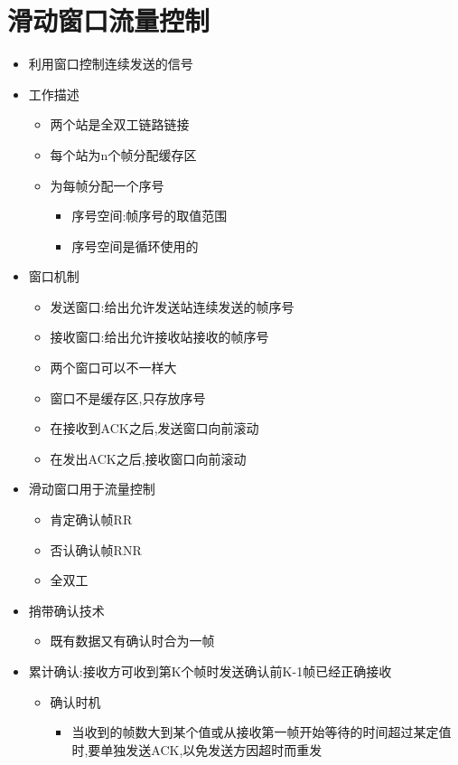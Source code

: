 \documentclass[a4paper,12pt,notitlepage]{article}
\begin{document}
\section{滑动窗口流量控制}
\begin{itemize}
	\item 利用窗口控制连续发送的信号
	\item 工作描述
	\begin{itemize}
		\item 两个站是全双工链路链接
		\item 每个站为n个帧分配缓存区
		\item 为每帧分配一个序号
		\begin{itemize}
			\item 序号空间:帧序号的取值范围
			\item 序号空间是循环使用的
		\end{itemize}
	\end{itemize}
	\item 窗口机制
	\begin{itemize}
		\item 发送窗口:给出允许发送站连续发送的帧序号
		\item 接收窗口:给出允许接收站接收的帧序号
		\item 两个窗口可以不一样大
		\item 窗口不是缓存区,只存放序号
		\item 在接收到ACK之后,发送窗口向前滚动
		\item 在发出ACK之后,接收窗口向前滚动
	\end{itemize}
	\item 滑动窗口用于流量控制
	\begin{itemize}
		\item 肯定确认帧RR
		\item 否认确认帧RNR
		\item 全双工
	\end{itemize}
	\item 捎带确认技术
	\begin{itemize}
		\item 既有数据又有确认时合为一帧
	\end{itemize}
	\item 累计确认:接收方可收到第K个帧时发送确认前K-1帧已经正确接收
	\begin{itemize}
		\item 确认时机
		\begin{itemize}
			\item 当收到的帧数大到某个值或从接收第一帧开始等待的时间超过某定值时,要单独发送ACK,以免发送方因超时而重发

\end{itemize}
\end{itemize}
\end{itemize}
\end{document}
